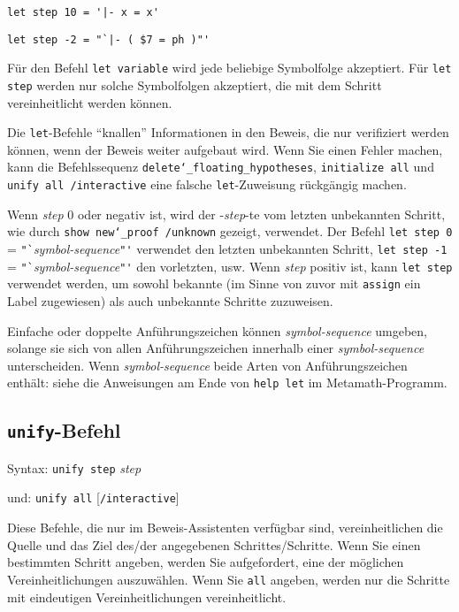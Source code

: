     \verb/let step 10 = '|- x = x'/

    \verb/let step -2 = "`|- ( $7 = ph )"'/

Für den Befehl \texttt{let variable} wird jede beliebige Symbolfolge akzeptiert.  Für \texttt{let step} werden nur solche Symbolfolgen akzeptiert, die mit dem Schritt vereinheitlicht werden können. 

Die \texttt{let}-Befehle "`knallen"' Informationen in den Beweis, die nur verifiziert werden können, wenn der Beweis weiter aufgebaut wird.  Wenn Sie einen Fehler machen, kann die Befehlssequenz \texttt{delete{\char`\_}floating_hypotheses}, \texttt{initialize all} und \texttt{unify all /interactive} eine falsche \texttt{let}-Zuweisung rückgängig machen. 

Wenn {\em step} 0 oder negativ ist, wird der -{\em step}-te vom letzten unbekannten Schritt, wie durch \texttt{show new{\char`\_}proof /unknown} gezeigt, verwendet.  Der Befehl \texttt{let step 0} = \verb/"`/{\em symbol-sequence}\verb/"'/ verwendet den letzten unbekannten Schritt, \texttt{let step -1} = \verb/"`/{\em symbol-sequence}\verb/"'/ den vorletzten, usw. Wenn {\em step} positiv ist, kann \texttt{let step} verwendet werden, um sowohl bekannte (im Sinne von zuvor mit \texttt{assign} ein Label zugewiesen) als auch unbekannte Schritte zuzuweisen. 

Einfache oder doppelte Anführungszeichen können {\em symbol-sequence} um\-ge\-ben, solange sie sich von allen Anführungszeichen innerhalb einer {\em symbol-sequence} unterscheiden.  Wenn {\em symbol-sequence} beide Arten von Anführungs\-zeichen enthält: siehe die Anweisungen am Ende von \texttt{help let} im Metamath-Programm. 


\subsection{\texttt{unify}-Befehl}

Syntax:  \texttt{unify step} {\em step}

      und:   \texttt{unify all} [\texttt{/interactive}]

Diese Befehle, die nur im Beweis-Assistenten verfügbar sind, vereinheitlichen die Quelle und das Ziel des/der angegebenen Schrittes/Schritte. Wenn Sie einen bestimmten Schritt angeben, werden Sie aufgefordert, eine der möglichen Vereinheitlichungen auszuwählen.  Wenn Sie \texttt{all} angeben, werden nur die Schritte mit eindeutigen Vereinheitlichungen vereinheitlicht. 

